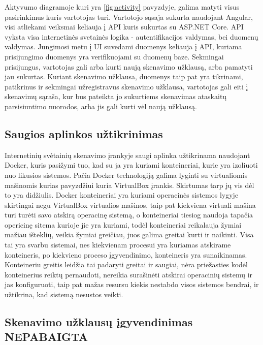 \documentclass[a4paper,12pt,fleqn]{article}
\begin{document}
Aktyvumo diagramoje kuri yra \ref{fig:activity} pavyzdyje, galima matyti visus pasirinkimus kuris vartotojas turi. Vartotojo sąsaja sukurta naudojant Angular, visi atliekami veiksmai keliauja į API kuris sukurtas su ASP.NET Core. API vyksta visa internetinės svetainės logika - autentifikacijos valdymas, bei duomenų valdymas. Jungimosi metu į UI suvedami duomenys keliauja į API, kuriama prisijungimo duomenys yra verifikuojami su duomenų baze. Sekmingai prisijungus, vartotojas gali arba kurti naują skenavimo užklausą, arba pamatyti jau sukurtas. Kuriant skenavimo užklausa, duomenys taip pat yra tikrinami, patikrinus ir sekmingai užregistravus skenavimo užklausa, vartotojas gali eiti į skenavimų sąraša, kur bus pateikta jo sukurtiems skenavimas ataskaitų parsisiuntimo nuorodos, arba jis gali kurti vėl naują užklausą.

\subsection{Saugios aplinkos užtikrinimas}

Internetinių svėtainių skenavimo įrankyje saugi aplinka užtikrinama naudojant Docker, kuris pasižymi tuo, kad su ja yra kuriami konteineriai, kurie yra izoliuoti nuo likusios sistemos. Pačia Docker technologiją galima lyginti su virtualiomis mašinomis kurias pavyzdžiui kuria VirtualBox įrankis. Skirtumas tarp jų vis dėl to yra didžiulis. Docker konteineriai yra kuriami operacinės sistemos lygyje skirtingai negu VirtualBox virtualios mašinos, taip pat kiekviena virtuali mašina turi turėti savo atskirą operacinę sistemą, o konteineriai tiesiog naudoja tapačia opericinę sitema kurioje jie yra kuriami, todėl konteineriai reikalauja žymiai mažiau išteklių, veikia žymiai greičiau, juos galima greitai kurti ir naikinti\cite{merkel2014docker}. Visa tai yra svarbu sistemai, nes kiekvienam procesui yra kuriamas atskirame konteineris, po kiekvieno proceso įgyvendinimo, konteineris yra sunaikinamas. Konteineriu greitis leidžia tai padaryti greitai ir saugiai, nėra priežasties kodėl konteinerius reiktų pernaudoti, nereikia surašinėti atskirai operacinių sistemų ir jas konfiguruoti, taip pat mažas resursu kiekis nestabdo visos sistemos bendrai, ir užtikrina, kad sistemą nesustos veikti.

\subsection{Skenavimo užklausų įgyvendinimas NEPABAIGTA}
\end{document}
